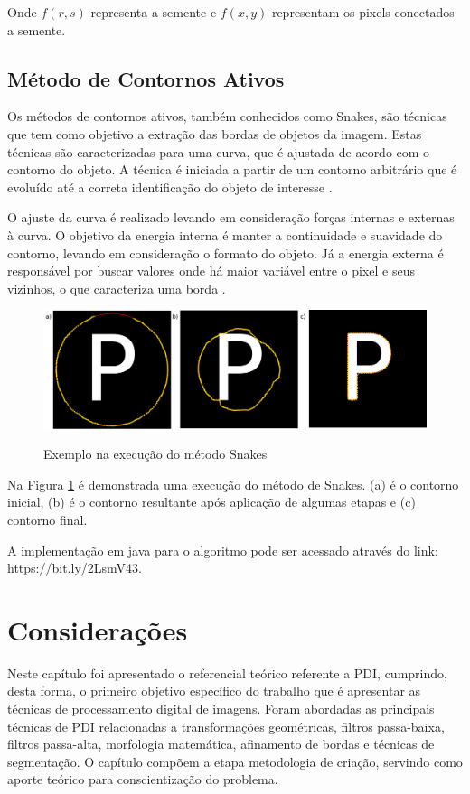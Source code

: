 \documentclass[
	12pt,				%
	oneside,			%
	a4paper,			%
	english,			%
	french,				%
	spanish,			%
	brazil,				%
	]{abntex2}
\begin{document}
Onde \(f(r,s)\) representa a semente e \(f(x, y)\) representam os pixels conectados a semente.
    
\subsection{Método de Contornos Ativos}     

Os métodos de contornos ativos, também conhecidos como Snakes, são técnicas que tem como objetivo a extração das bordas de objetos da imagem. Estas técnicas são caracterizadas para uma curva, que é ajustada de acordo com o contorno do objeto. A técnica é iniciada a partir de um contorno arbitrário que é evoluído até a correta identificação do objeto de interesse \cite{conciAzevedoLeta:2008}.

O ajuste da curva é realizado levando em consideração forças internas e externas à curva. O objetivo da energia interna é manter a continuidade e suavidade do contorno, levando em consideração o formato do objeto. Já a energia externa é responsável por buscar valores onde há maior variável entre o pixel e seus vizinhos, o que caracteriza uma borda \cite{kass:1988}.

\begin{figure}[ht]
\centering
\caption{Exemplo na execução do método Snakes}
\includegraphics[width=1\textwidth]{imagens/snake.png}
\sourceAuthor
\label{fig:snake}
\end{figure}

Na Figura \ref{fig:snake} é demonstrada uma execução do método de Snakes. (a) é o contorno inicial, (b) é o contorno resultante após aplicação de algumas etapas e (c) contorno final.

A implementação em java para o algoritmo pode ser acessado através do link: \url{https://bit.ly/2LsmV43}.

\section{Considerações}

Neste capítulo foi apresentado o referencial teórico referente a PDI, cumprindo, desta forma, o primeiro objetivo específico do trabalho que é apresentar as técnicas de processamento digital de imagens. Foram abordadas as principais técnicas de PDI relacionadas a transformações geométricas, filtros passa-baixa, filtros passa-alta, morfologia matemática, afinamento de bordas e técnicas de segmentação. O capítulo compõem a etapa metodologia de criação, servindo como aporte teórico para conscientização do problema.
\end{document}

